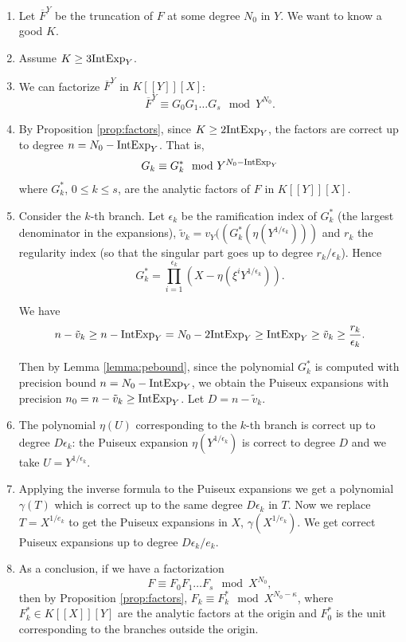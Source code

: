 \documentclass[a4paper,11pt,reqno]{amsart}%
\theoremstyle{definition}
\theoremstyle{plain}
\theoremstyle{remark}
\newcommand\ct[1]{\text{\rmfamily\upshape #1}}
\newcommand{\IntExpY}{\ct{IntExp}_Y}
\begin{document}
\begin{enumerate}
\item Let $\overline{F}^{Y}$ be the truncation of $F$ at some degree $N_0$ in $Y$. We want to know a good $K$.
\item Assume $K \ge 3 \IntExpY$.
\item We can factorize $\overline{F}^{Y}$ in $K[[Y]][X]$:
$$\overline{F}^{Y} \equiv G_0 G_1 \dots G_s \mod Y^{N_0}.$$

\item By Proposition \ref{prop:factors}, since $K \ge 2 \IntExpY$, the factors are correct up to degree $n = N_0 - \IntExpY$. That is,
$$G_k \equiv G_k^* \mod Y^{N_0 - \IntExpY}$$
where $G_k^*$, $0 \le k \le s$, are the analytic factors of $F$ in $K[[Y]][X]$.

\item Consider the $k$-th branch. Let $\epsilon_k$ be the ramification index of $G^*_k$ (the largest denominator in the expansions), $\tilde v_k = v_Y((G^*_k(\eta(Y^{1/\epsilon_k})))$ and $r_k$ the regularity index (so that the singular part goes up to degree $r_k/\epsilon_k$). Hence
$$G^*_k = \prod_{i=1}^{\epsilon_k} (X - \eta(\xi^i Y^{1/\epsilon_k})).$$

We have
$$n - \tilde v_k \ge n - \IntExpY = N_0 - 2 \IntExpY \ge \IntExpY \ge \tilde v_k \ge \frac{r_k}{\epsilon_k}.$$

Then by Lemma \ref{lemma:pebound}, since the polynomial $G^*_k$ is computed with precision bound $n = N_0 - \IntExpY$, we obtain the Puiseux expansions with precision $n_0 = n - \tilde v_k \ge \IntExpY$. Let $D = n - \tilde v_k$.
\item The polynomial $\eta(U)$ corresponding to the $k$-th branch is correct up to degree $D\epsilon_k$: the Puiseux expansion $\eta(Y^{1/{\epsilon_k}})$ is correct to degree $D$ and we take $U = Y^{1/{\epsilon_k}}$.
\item Applying the inverse formula to the Puiseux expansions we get a polynomial $\gamma(T)$ which is correct up to the same degree $D\epsilon_k$ in $T$. Now we replace $T = X^{1/e_k}$ to get the Puiseux expansions in $X$, $\gamma(X^{1/e_k})$. We get correct Puiseux expansions up to degree $D\epsilon_k/e_k$.


\item As a conclusion, if we have a factorization
\begin{equation} \label{FXfactors}
F \equiv  F_0 F_1 \dots F_s \mod X^{N_0},
\end{equation}
then by Proposition \ref{prop:factors}, $F_k \equiv F_k^* \mod X^{N_0 - \kappa}$, where $F_k^* \in K[[X]][Y]$ are the analytic factors at the origin and $F_0^*$ is the unit corresponding to the branches outside the origin.


\end{enumerate}
\end{document}
